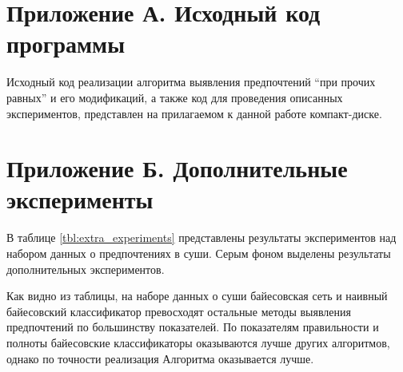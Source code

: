 \appendix
\chapter*{Приложение А. Исходный код программы}

Исходный код реализации алгоритма выявления предпочтений \enquote{при прочих равных} и его модификаций, а также код для проведения описанных экспериментов, представлен на прилагаемом к данной работе компакт-диске.

\appendix
\chapter*{Приложение Б. Дополнительные эксперименты}

В таблице \ref{tbl:extra_experiments} представлены результаты экспериментов над набором данных о предпочтениях в суши. Серым фоном выделены результаты дополнительных экспериментов.

Как видно из таблицы, на наборе данных о суши байесовская сеть и наивный байесовский классификатор превосходят остальные методы выявления предпочтений по большинству показателей. По показателям правильности и полноты байесовские классификаторы оказываются лучше других алгоритмов, однако по точности реализация Алгоритма оказывается лучше.

